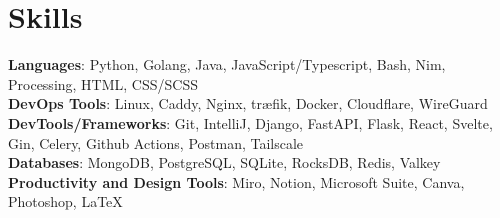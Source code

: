 \documentclass[letterpaper,11pt]{article}
\begin{document}
\section{Skills}
\small{
\textbf{Languages}{: Python, Golang, Java, JavaScript/Typescript, Bash, Nim, Processing, HTML, CSS/SCSS} \\
\textbf{DevOps Tools}{: Linux, Caddy, Nginx, træfik, Docker, Cloudflare, WireGuard} \\
\textbf{DevTools/Frameworks}{: Git, IntelliJ, Django, FastAPI, Flask, React, Svelte, Gin, Celery, Github Actions, Postman, Tailscale} \\
\textbf{Databases}{: MongoDB, PostgreSQL, SQLite, RocksDB, Redis, Valkey} \\
\textbf{Productivity and Design Tools}{: Miro, Notion, Microsoft Suite, Canva, Photoshop, LaTeX} \\
}
\end{document}
